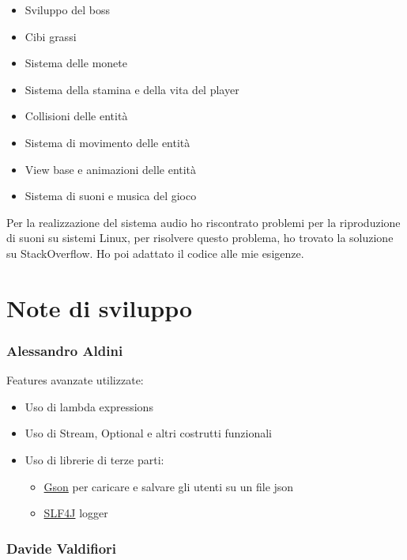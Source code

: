 \documentclass[a4paper,12pt]{report}
\begin{document}
    \begin{itemize}
        \item Sviluppo del boss
        \item Cibi grassi
        \item Sistema delle monete
        \item Sistema della stamina e della vita del player
        \item Collisioni delle entità
        \item Sistema di movimento delle entità
        \item View base e animazioni delle entità
        \item Sistema di suoni e musica del gioco
    \end{itemize}

    Per la realizzazione del sistema audio ho riscontrato problemi per la riproduzione di suoni su sistemi Linux, per risolvere questo problema, ho trovato la soluzione su StackOverflow. Ho poi adattato il codice alle mie esigenze.

    \section{Note di sviluppo}

    \subsubsection{Alessandro Aldini}

    Features avanzate utilizzate:

    \begin{itemize}
        \item Uso di lambda expressions
        \item Uso di Stream, Optional e altri costrutti funzionali
        \item Uso di librerie di terze parti:
        \begin{itemize}
            \item \href{https://github.com/google/gson}{Gson} per caricare e salvare gli utenti su un file json
            \item \href{https://github.com/qos-ch/slf4j}{SLF4J} logger
        \end{itemize}
    \end{itemize}

    \subsubsection{Davide Valdifiori}
\end{document}
